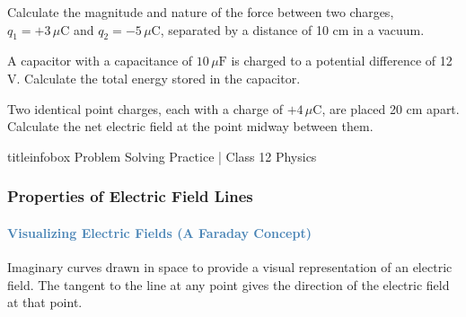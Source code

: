 \begin{frame}
\begin{frame}
\begin{formulabox}
\vspace{0.1cm}
Calculate the magnitude and nature of the force between two charges, $q_1 = +3\,\mu\text{C}$ and $q_2 = -5\,\mu\text{C}$, separated by a distance of 10 cm in a vacuum.
\vspace{0.1cm}
\end{formulabox}

\vspace{0.3cm}

\begin{formulabox}
\vspace{0.1cm}
A capacitor with a capacitance of $10\,\mu\text{F}$ is charged to a potential difference of 12 V. Calculate the total energy stored in the capacitor.
\vspace{0.1cm}
\end{formulabox}

\vspace{0.3cm}

\begin{formulabox}
\vspace{0.1cm}
Two identical point charges, each with a charge of $+4\,\mu\text{C}$, are placed 20 cm apart. Calculate the net electric field at the point midway between them.
\vspace{0.1cm}
\end{formulabox}

\vfill

\begin{beamercolorbox}[wd=\textwidth,ht=0.5cm,dp=0.1cm,center]{titleinfobox}
    \small\color{coolgray} Problem Solving Practice | Class 12 Physics
\end{beamercolorbox}
\end{frame}



\begin{frame}
\frametitle{\textsf{\textbf{Properties of Electric Field Lines}}}
\framesubtitle{\textcolor{steelblue}{Visualizing Electric Fields (A Faraday Concept)}}

\begin{keybox}
\vspace{0.1cm}
Imaginary curves drawn in space to provide a visual representation of an electric field. The tangent to the line at any point gives the direction of the electric field at that point.
\vspace{0.1cm}
\end{keybox}


\end{frame}
\end{frame}
